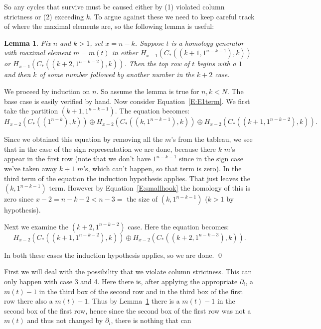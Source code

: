 \documentclass{elsart}
\newtheorem{lemma}[theorem]{Lemma}
\begin{document}
\begin{pf}
  So any cycles that survive must be caused either by (1) violated column strictness or (2) exceeding $k$. To argue against
  these we need to keep careful track of where the maximal elements are, so the following lemma is useful:

  \begin{lemma}\label{L:toprow1}
    Fix $n$ and $k > 1$, set $x=n-k$. Suppose $t$ is a homology generator with maximal element $m=m(t)$ in either 
    $H_{x-1}(C_*((k+1, 1^{n-k-1}),k))$ or $H_{x-1}(C_*((k+2, 1^{n-k-2}),k))$. Then the top row of $t$ begins with a $1$ 
    and then $k$ of some number followed by another number in the $k+2$ case. 
  \end{lemma}
  \begin{pf}
    We proceed by induction on $n$. So assume the lemma is true for $n, k < N$. The base case is easily verified by hand.
    Now consider Equation~\ref{E:E1term}. We first take the partition $(k+1, 1^{n-k-1})$. The equation becomes: 
    \begin{equation}\label{E:E1term-hookcase-1}
      H_{x-2}(C_*((1^{n-k}),k)) \oplus 
      H_{x-2}(C_*((k, 1^{n-k-1}),k)) \oplus H_{x-2}(C_*((k+1, 1^{n-k-2}),k)).
    \end{equation}

    Since we obtained this equation by removing all the $m$'s from the tableau, we see that in the case of the  sign 
    representation we are done, because there $k$ $m$'s appear in the first row (note that we don't have $1^{n-k-1}$ since in the  sign case we've 
    taken away $k+1$ $m$'s, which can't happen, so that term is zero). In the third term of the equation the induction 
    hypothesis applies. That just leaves the $(k, 1^{n-k-1})$ term. However by 
    Equation~\ref{E:smallhook} the homology of this is zero since $x-2 = n-k -2 < n-3 = $ the size of $(k, 1^{n-k-1})$
    ($k>1$ by hypothesis).

    Next we examine the $(k+2, 1^{n-k-2})$ case. Here the equation becomes: 
    \begin{equation}\label{E:E1term-hookcase-2} 
      H_{x-2}(C_*((k+1, 1^{n-k-2}),k)) \oplus H_{x-2}(C_*((k+2, 1^{n-k-3}),k)).
    \end{equation}
     
    In both these cases the induction hypothesis applies, so we are done.
\qed  
\end{pf} 
  

  First we will deal with the possibility that we violate column strictness. This can only happen with case 3 and 4. Here
  there is, after applying the appropriate $\partial_i$,  a $m(t)-1$ in the third box of the second row and in the third box 
  of the first row there also a $m(t)-1$. Thus by Lemma~\ref{L:toprow1} there is a $m(t)-1$ in the second box of the first row, 
  hence since the second box of the first row was not a $m(t)$ and thus not changed by $\partial_i$, there is nothing that can


\end{pf}
\end{document}
